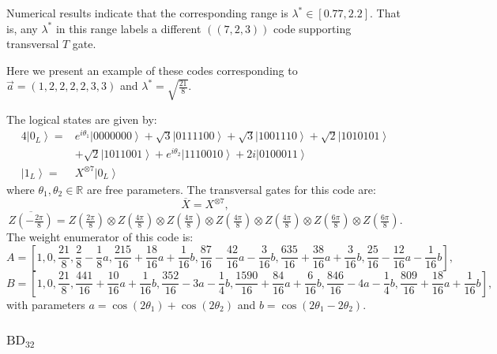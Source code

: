 \documentclass[8pt]{article}
\theoremstyle{definition}
\begin{document}
Numerical results indicate that
the corresponding range is $\lambda^{*}\in[0.77,2.2]$.
That is, any $\lambda^{*}$ in this range labels a different $((7,2,3))$ code supporting transversal $T$ gate.

Here we present an example of these codes corresponding to $\vec{a}=\left(1,2,2,2,2,3,3\right)$ and $\lambda^{*}=\sqrt{\tfrac{21}{8}}$.

The logical states are given by:
\begin{align*}
    4\left|0_{L}\right\rangle = & e^{i\theta_{1}}\left|0000000\right\rangle +\sqrt{3}\left|0111100\right\rangle +\sqrt{3}\left|1001110\right\rangle +\sqrt{2}\left|1010101\right\rangle \\
                                & +\sqrt{2}\left|1011001\right\rangle +e^{i\theta_{2}}\left|1110010\right\rangle +2i\left|0100011\right\rangle                                          \\
    \left|1_{L}\right\rangle =  & X^{\otimes7}\left|0_{L}\right\rangle
\end{align*}
where \(\theta_1, \theta_2 \in \mathbb{R}\) are free parameters. The transversal gates for this code are:
\[ \overline{X}=X^{\otimes7}, \]
\[ \overline{Z\left(-\tfrac{2\pi}{8}\right)}=Z\left(\tfrac{2\pi}{8}\right)\otimes Z\left(\tfrac{4\pi}{8}\right)\otimes Z\left(\tfrac{4\pi}{8}\right)\otimes Z\left(\tfrac{4\pi}{8}\right)\otimes Z\left(\tfrac{4\pi}{8}\right)\otimes Z\left(\tfrac{6\pi}{8}\right)\otimes Z\left(\tfrac{6\pi}{8}\right). \]
The weight enumerator of this code is:
\[ A=\left[1,0,\frac{21}{8},\frac{2}{8}-\frac{1}{8}a,\frac{215}{16}+\frac{18}{16}a+\frac{1}{16}b,\frac{87}{16}-\frac{42}{16}a-\frac{3}{16}b,\frac{635}{16}+\frac{38}{16}a+\frac{3}{16}b,\frac{25}{16}-\frac{12}{16}a-\frac{1}{16}b\right], \]
\[ B=\left[1,0,\frac{21}{8},\frac{441}{16}+\frac{10}{16}a+\frac{1}{16}b,\frac{352}{16}-3a-\frac{1}{4}b,\frac{1590}{16}+\frac{84}{16}a+\frac{6}{16}b,\frac{846}{16}-4a-\frac{1}{4}b,\frac{809}{16}+\frac{18}{16}a+\frac{1}{16}b\right], \]
with parameters \(a = \cos(2\theta_1) + \cos(2\theta_2)\) and \(b = \cos(2\theta_1 - 2\theta_2)\).

\subsubsection{\texorpdfstring{$\mathrm{BD}_{32}$}{BD₃₂}}
\end{document}
